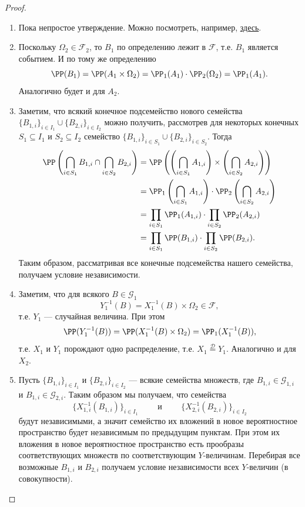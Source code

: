 \documentclass[12pt,a4paper]{article}
\newcommand{\Deq}{\mathrel{\stackrel{\mathcal{D}}{=}}}
\begin{document}
    \begin{proof}\ 
        \begin{enumerate}
            \item Пока непростое утверждение. Можно посмотреть, например, \href{https://teach-in.ru/file/synopsis/pdf/probability-theory-shabanov-M-2.pdf}{здесь}.
            \item Поскольку $\Omega_2 \in \mathcal{F}_2$, то $B_1$ по определению лежит в $\mathcal{F}$, т.е. $B_1$ является событием. И по тому же определению
                \[\PP(B_1) = \PP(A_1 \times \Omega_2) = \PP_1(A_1) \cdot \PP_2(\Omega_2) = \PP_1(A_1).\]
                Аналогично будет и для $A_2$.
            \item Заметим, что всякий конечное подсемейство нового семейства $\{B_{1,i}\}_{i \in I_1} \cup \{B_{2,i}\}_{i \in I_2}$ можно получить, рассмотрев для некоторых конечных $S_1 \subseteq I_1$ и $S_2 \subseteq I_2$ семейство $\{B_{1,i}\}_{i \in S_1} \cup \{B_{2,i}\}_{i \in S_2}$. Тогда
                \begin{align*}
                    \PP\left(\bigcap_{i \in S_1} B_{1, i} \cap \bigcap_{i \in S_2} B_{2, i}\right)
                    &= \PP\left(\left(\bigcap_{i \in S_1} A_{1, i}\right) \times \left(\bigcap_{i \in S_2} A_{2, i}\right)\right)\\
                    &= \PP_1\left(\bigcap_{i \in S_1} A_{1, i}\right) \cdot \PP_2\left(\bigcap_{i \in S_2} A_{2, i}\right)\\
                    &= \prod_{i \in S_1} \PP_1(A_{1, i}) \cdot \prod_{i \in S_2} \PP_2(A_{2, i})\\
                    &= \prod_{i \in S_1} \PP(B_{1, i}) \cdot \prod_{i \in S_2} \PP(B_{2, i}).
                \end{align*}
                Таким образом, рассматривая все конечные подсемейства нашего семейства, получаем условие независимости.
            \item Заметим, что для всякого $B \in \mathcal{G}_1$
                \[Y_1^{-1}(B) = X_1^{-1}(B) \times \Omega_2 \in \mathcal{F},\]
                т.е. $Y_1$ --- случайная величина. При этом
                \[\PP(Y_1^{-1}(B)) = \PP(X_1^{-1}(B) \times \Omega_2) = \PP_1(X_1^{-1}(B)),\]
                т.е. $X_1$ и $Y_1$ порождают одно распределение, т.е. $X_1 \Deq Y_1$. Аналогично и для $X_2$.
            \item Пусть $\{B_{1,i}\}_{i \in I_1}$ и $\{B_{2,i}\}_{i \in I_2}$ --- всякие семейства множеств, где $B_{1,i} \in \mathcal{G}_{1,i}$ и $B_{1,i} \in \mathcal{G}_{2,i}$. Таким образом мы получаем, что семейства
                \[\{X_{1,i}^{-1}(B_{1,i})\}_{i \in I_1} \qquad \text{ и } \qquad \{X_{2,i}^{-1}(B_{2,i})\}_{i \in I_2}\]
                будут независимыми, а значит семейство их вложений в новое вероятностное пространство будет независимым по предыдущим пунктам. При этом их вложения в новое вероятностное пространство есть прообразы соответствующих множеств по соответствующим $Y$-величинам. Перебирая все возможные $B_{1,i}$ и $B_{2,i}$ получаем условие независимости всех $Y$-величин (в совокупности).
        \end{enumerate}
    \end{proof}
\end{document}
